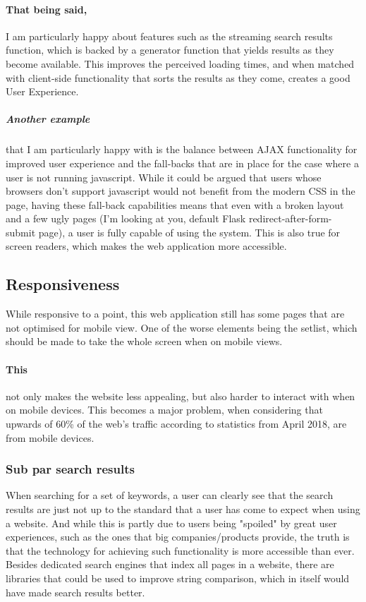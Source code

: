 \documentclass[10pt, a4paper]{article}
\begin{document}
        \paragraph{That being said,} I am particularly happy about features such as the streaming search results function, which is backed by a generator function that yields results as they become available. This improves the perceived loading times, and when matched with client-side functionality that sorts the results as they come, creates a good User Experience.
        \subparagraph{Another example} that I am particularly happy with is the balance between AJAX functionality for improved user experience and the fall-backs that are in place for the case where a user is not running javascript. While it could be argued that users whose browsers don't support javascript would not benefit from the modern CSS in the page, having these fall-back capabilities means that even with a broken layout and a few ugly pages (I'm looking at you, default Flask redirect-after-form-submit page), a user is fully capable of using the system. This is also true for screen readers, which makes the web application more accessible.

        \subsection{Responsiveness}
        While responsive to a point, this web application still has some pages that are not optimised for mobile view.
        One of the worse elements being the setlist, which should be made to take the whole screen when on mobile views.
        \paragraph{This} not only makes the website less appealing, but also harder to interact with when on mobile devices. This becomes a major problem, when considering that upwards of 60\% of the web's traffic according to statistics from April 2018, are from mobile devices.

        \subsubsection{Sub par search results}
        When searching for a set of keywords, a user can clearly see that the search results are just not up to the standard that a user has come to expect when using a website. And while this is partly due to users being "spoiled" by great user experiences, such as the ones that big companies/products provide, the truth is that the technology for achieving such functionality is more accessible than ever. Besides dedicated search engines that index all pages in a website, there are libraries that could be used to improve string comparison, which in itself would have made search results better.
\end{document}
